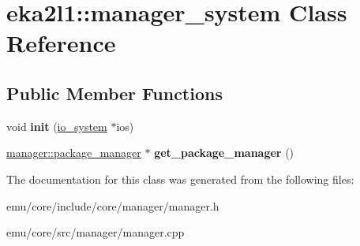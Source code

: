 \hypertarget{classeka2l1_1_1manager__system}{}\section{eka2l1\+:\+:manager\+\_\+system Class Reference}
\label{classeka2l1_1_1manager__system}
\subsection*{Public Member Functions}
\begin{DoxyCompactItemize}
\item 
\mbox{\label{classeka2l1_1_1manager__system_a979e16c9e4a916f3b4fbb17d20e760cc}} 
void {\bfseries init} (\mbox{\hyperlink{classeka2l1_1_1io__system}{io\+\_\+system}} $\ast$ios)
\item 
\mbox{\label{classeka2l1_1_1manager__system_a3a644bb8a373478043792dde921e823a}} 
\mbox{\hyperlink{classeka2l1_1_1manager_1_1package__manager}{manager\+::package\+\_\+manager}} $\ast$ {\bfseries get\+\_\+package\+\_\+manager} ()
\end{DoxyCompactItemize}


The documentation for this class was generated from the following files\+:\begin{DoxyCompactItemize}
\item 
emu/core/include/core/manager/manager.\+h\item 
emu/core/src/manager/manager.\+cpp\end{DoxyCompactItemize}
